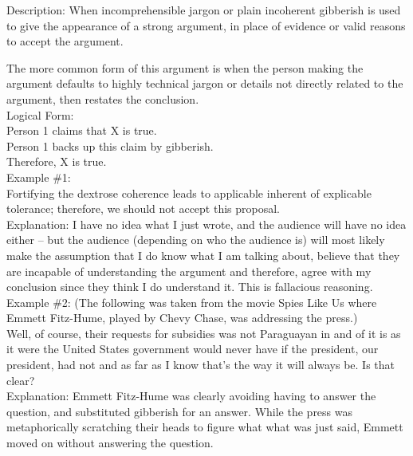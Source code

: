 \documentclass[a4paper,12pt,single,pdftex]{scrbook}
\begin{document}
  
    Description: When incomprehensible jargon or plain incoherent gibberish is used to give the appearance of a strong argument, in place of evidence or valid reasons to accept the argument.

    
      The more common form of this argument is when the person making the argument defaults to highly technical jargon or details not directly related to the argument, then restates the conclusion.
    \\

    
      Logical Form:
    \\

    
      Person 1 claims that X is true.
    \\

    
      Person 1 backs up this claim by gibberish.
    \\

    
      Therefore, X is true.
    \\

    
      Example \#1:
    \\

    
      Fortifying the dextrose coherence leads to applicable inherent of explicable tolerance; therefore, we should not accept this proposal.
    \\

    
      Explanation: I have no idea what I just wrote, and the audience will have no idea either -- but the audience (depending on who the audience is) will most likely make the assumption that I do know what I am talking about, believe that they are incapable of understanding the argument and therefore, agree with my conclusion since they think I do understand it.  This is fallacious reasoning.
    \\

    
      Example \#2: (The following was taken from the movie Spies Like Us where Emmett Fitz-Hume, played by Chevy Chase, was addressing the press.)
    \\

    
      Well, of course, their requests for subsidies was not Paraguayan in and of it is as it were the United States government would never have if the president, our president, had not and as far as I know that's the way it will always be. Is that clear?
    \\

    
      Explanation: Emmett Fitz-Hume was clearly avoiding having to answer the question, and substituted gibberish for an answer. While the press was metaphorically scratching their heads to figure what what was just said, Emmett moved on without answering the question.
    \\
\end{document}
